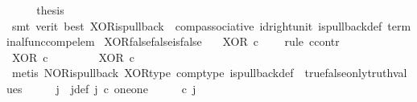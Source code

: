 \begin{isabellebody}
\ \ \isamarkupfalse%
\ \isamarkupfalse%
\ {\isacharquery}{\kern0pt}thesis\isanewline
\ \ \ \ \isamarkupfalse%
\ {\isacharparenleft}{\kern0pt}smt\ {\isacharparenleft}{\kern0pt}verit{\isacharcomma}{\kern0pt}\ best{\isacharparenright}{\kern0pt}\ XOR{\isacharunderscore}{\kern0pt}is{\isacharunderscore}{\kern0pt}pullback\ \ comp{\isacharunderscore}{\kern0pt}associative{}\ id{\isacharunderscore}{\kern0pt}right{\isacharunderscore}{\kern0pt}unit{}\ is{\isacharunderscore}{\kern0pt}pullback{\isacharunderscore}{\kern0pt}def\ terminal{\isacharunderscore}{\kern0pt}func{\isacharunderscore}{\kern0pt}comp{\isacharunderscore}{\kern0pt}elem{\isacharparenright}{\kern0pt}\isanewline
{}\isamarkupfalse%
%
\endisatagproof
{\isafoldproof}%
%
\isadelimproof
\isanewline
%
\endisadelimproof
\isanewline
{}\isamarkupfalse%
\ XOR{\isacharunderscore}{\kern0pt}false{\isacharunderscore}{\kern0pt}false{\isacharunderscore}{\kern0pt}is{\isacharunderscore}{\kern0pt}false{\isacharcolon}{\kern0pt}\isanewline
\ \ \ {\isachardoublequoteopen}XOR\ {\isasymcirc}\isactrlsub c\ \ {\isasymlangle}{\isasymf}{\isacharcomma}{\kern0pt}{\isasymf}{\isasymrangle}\ {\isacharequal}{\kern0pt}\ {\isasymf}{\isachardoublequoteclose}\isanewline
%
\isadelimproof
%
\endisadelimproof
%
\isatagproof
{}\isamarkupfalse%
{\isacharparenleft}{\kern0pt}rule\ ccontr{\isacharparenright}{\kern0pt}\isanewline
\ \ \isamarkupfalse%
\ {\isachardoublequoteopen}XOR\ {\isasymcirc}\isactrlsub c\ {\isasymlangle}{\isasymf}{\isacharcomma}{\kern0pt}{\isasymf}{\isasymrangle}\ {\isasymnoteq}\ {\isasymf}{\isachardoublequoteclose}\isanewline
\ \ \isamarkupfalse%
\ \isamarkupfalse%
\ {\isachardoublequoteopen}XOR\ {\isasymcirc}\isactrlsub c\ {\isasymlangle}{\isasymf}{\isacharcomma}{\kern0pt}{\isasymf}{\isasymrangle}\ \ {\isacharequal}{\kern0pt}\ {\isasymt}{\isachardoublequoteclose}\isanewline
\ \ \ \ \isamarkupfalse%
\ {\isacharparenleft}{\kern0pt}metis\ NOR{\isacharunderscore}{\kern0pt}is{\isacharunderscore}{\kern0pt}pullback\ XOR{\isacharunderscore}{\kern0pt}type\ comp{\isacharunderscore}{\kern0pt}type\ is{\isacharunderscore}{\kern0pt}pullback{\isacharunderscore}{\kern0pt}def\ \ true{\isacharunderscore}{\kern0pt}false{\isacharunderscore}{\kern0pt}only{\isacharunderscore}{\kern0pt}truth{\isacharunderscore}{\kern0pt}values{\isacharparenright}{\kern0pt}\isanewline
\ \ \isamarkupfalse%
\ \isamarkupfalse%
\ j\ \ j{\isacharunderscore}{\kern0pt}def{\isacharcolon}{\kern0pt}\ {\isachardoublequoteopen}j\ {\isasymin}\isactrlsub c\ one{\isasymCoprod}one\ {\isasymand}\ {\isacharparenleft}{\kern0pt}{\isasymlangle}{\isasymt}{\isacharcomma}{\kern0pt}\ {\isasymf}{\isasymrangle}\ {\isasymamalg}{\isasymlangle}{\isasymf}{\isacharcomma}{\kern0pt}\ {\isasymt}{\isasymrangle}{\isacharparenright}{\kern0pt}\ {\isasymcirc}\isactrlsub c\ j\ \ {\isacharequal}{\kern0pt}\ {\isasymlangle}{\isasymf}{\isacharcomma}{\kern0pt}{\isasymf}{\isasymrangle}{\isachardoublequoteclose}\isanewline

\end{isabellebody}
